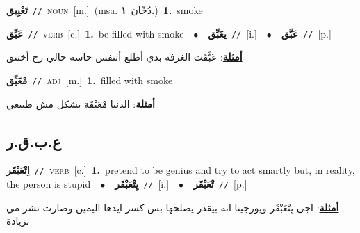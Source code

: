 \documentclass[10pt,a4paper,twoside]{article} %
\begin{document}
\begin{multicols}{2}
{{{{{{{{\setlength\topsep{0pt}\textbf{\foreignlanguage{arabic}{تَعْبِيق}}\ {\color{gray}\texttt{//}\color{black}}\ \textsc{noun}\ [m.]\ \color{gray}(msa. \foreignlanguage{arabic}{دُخّان}~\foreignlanguage{arabic}{\textbf{١.}})\color{black}\ \textbf{1.}~smoke\ 

{\setlength\topsep{0pt}\textbf{\foreignlanguage{arabic}{عَبِّق}}\ {\color{gray}\texttt{//}\color{black}}\ \textsc{verb}\ [c.]\ \textbf{1.}~be filled with smoke\ \ $\bullet$\ \ \setlength\topsep{0pt}\textbf{\foreignlanguage{arabic}{يعَبِّق}}\ {\color{gray}\texttt{//}\color{black}}\ [i.]\ \ $\bullet$\ \ \setlength\topsep{0pt}\textbf{\foreignlanguage{arabic}{عَبَّق}}\ {\color{gray}\texttt{//}\color{black}}\ [p.]\  \begin{flushright}\color{gray}\foreignlanguage{arabic}{\textbf{\underline{\foreignlanguage{arabic}{أمثلة}}}: عَبَّقَت الغرفة بدي أطلع أتنفس حاسة حالي رح أختنق}\end{flushright}\color{black}} \vspace{2mm}

{\setlength\topsep{0pt}\textbf{\foreignlanguage{arabic}{مْعَبِّق}}\ {\color{gray}\texttt{//}\color{black}}\ \textsc{adj}\ [m.]\ \textbf{1.}~filled with smoke\  \begin{flushright}\color{gray}\foreignlanguage{arabic}{\textbf{\underline{\foreignlanguage{arabic}{أمثلة}}}: الدنيا مْعَبْقَة بشكل مش طبيعي}\end{flushright}\color{black}} \vspace{2mm}

\vspace{-3mm}
\subsection*{\color{blue}\foreignlanguage{arabic}{ع.ب.ق.ر}\color{blue}{}} 

{\setlength\topsep{0pt}\textbf{\foreignlanguage{arabic}{اِتْعَبْقَر}}\ {\color{gray}\texttt{//}\color{black}}\ \textsc{verb}\ [c.]\ \textbf{1.}~pretend to be genius and try to act smartly but, in reality, the person is stupid\ \ $\bullet$\ \ \setlength\topsep{0pt}\textbf{\foreignlanguage{arabic}{يِتْعَبْقَر}}\ {\color{gray}\texttt{//}\color{black}}\ [i.]\ \ $\bullet$\ \ \setlength\topsep{0pt}\textbf{\foreignlanguage{arabic}{تْعَبْقَر}}\ {\color{gray}\texttt{//}\color{black}}\ [p.]\  \begin{flushright}\color{gray}\foreignlanguage{arabic}{\textbf{\underline{\foreignlanguage{arabic}{أمثلة}}}: اجى يِتْعَبْقَر ويورجينا انه بيقدر يصلحها بس كسر ايدها اليمين وصارت تشر مي بزيادة}\end{flushright}\color{black}} \vspace{2mm}

}}}}}}}}
\end{multicols}
\end{document}
